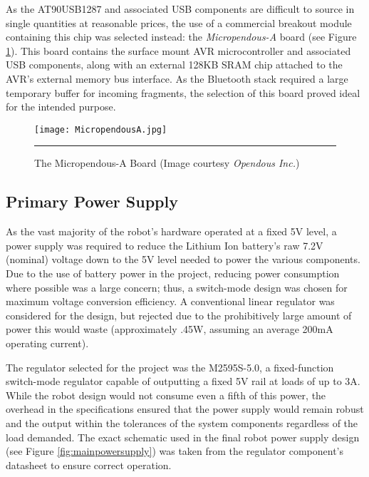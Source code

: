 As the AT90USB1287 and associated USB components are difficult to source in single quantities at reasonable prices, the use of a commercial breakout module containing this chip was selected instead: the \textit{Micropendous-A} board (see Figure \ref{fig:micropendous}). This board contains the surface mount AVR microcontroller and associated USB components, along with an external 128KB SRAM chip attached to the AVR's external memory bus interface. As the Bluetooth stack required a large temporary buffer for incoming fragments, the selection of this board proved ideal for the intended purpose.

\begin{figure}[tbph]
	\vspace{1em}
	\centering
		\texttt{[image: MicropendousA.jpg]}
	\rule{35em}{0.5pt}
	\caption[Micropendous-A Board]{The Micropendous-A Board (Image courtesy \textit{Opendous Inc.})}
	\label{fig:micropendous}
\end{figure}

\FloatBarrier
\subsection{Primary Power Supply}

As the vast majority of the robot's hardware operated at a fixed 5V level, a power supply was required to reduce the Lithium Ion battery's raw 7.2V (nominal) voltage down to the 5V level needed to power the various components. Due to the use of battery power in the project, reducing power consumption where possible was a large concern; thus, a switch-mode design was chosen for maximum voltage conversion efficiency. A conventional linear regulator was considered for the design, but rejected due to the prohibitively large amount of power this would waste (approximately .45W, assuming an average 200mA operating current).

The regulator selected for the project was the M2595S-5.0, a fixed-function switch-mode regulator capable of outputting a fixed 5V rail at loads of up to 3A. While the robot design would not consume even a fifth of this power, the overhead in the specifications ensured that the power supply would remain robust and the output within the tolerances of the system components regardless of the load demanded. The exact schematic used in the final robot power supply design (see Figure \ref{fig:mainpowersupply}) was taken from the regulator component's datasheet to ensure correct operation.

